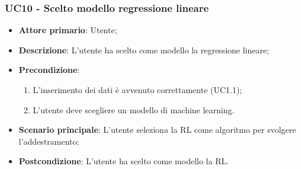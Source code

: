 \subsubsection{UC10 - Scelto modello regressione lineare}%
\label{sssec:uc10}
\begin{itemize}
  \item \textbf{Attore primario}: Utente;
  \item \textbf{Descrizione}: L'utente ha scelto come modello la regressione lineare;
  \item \textbf{Precondizione}:
  \begin{enumerate}
    \item L'inserimento dei dati è avvenuto correttamente (UC1.1);
    \item L'utente deve scegliere un modello di machine learning.
  \end{enumerate}
  \item \textbf{Scenario principale}: L'utente seleziona la RL come algoritmo per svolgere l'addestramento;
  \item \textbf{Postcondizione}: L'utente ha scelto come modello la RL.
\end{itemize}
